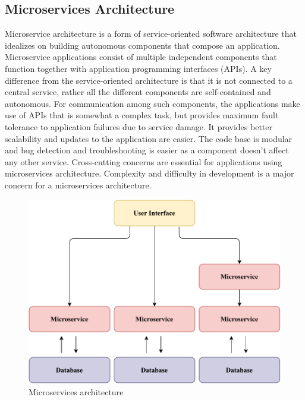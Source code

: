 \documentclass{home_assignment}
\begin{document}
\subsection{Microservices Architecture}
Microservice architecture is a form of service-oriented software architecture that idealizes on building autonomous components that compose an application. Microservice applications consist of multiple independent components that function together with application programming interfaces (APIs). A key difference from the service-oriented architecture is that it is not connected to a central service, rather all the different components are self-contained and autonomous. For communication among such components, the applications make use of APIs that is somewhat a complex task, but provides maximum fault tolerance to application failures due to service damage. It provides better scalability and updates to the application are easier. The code base is modular and bug detection and troubleshooting is easier as a component doesn't affect any other service. Cross-cutting concerns are essential for applications using microservices architecture. Complexity and difficulty in development is a major concern for a microservices architecture.
\begin{figure}[H]
    \centering
    \includegraphics{../Figures/mircoservice.pdf}
    \caption{Microservices architecture}
    \label{fig:micro}
\end{figure}
\end{document}
